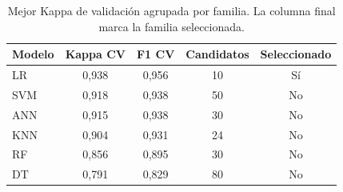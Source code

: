 \begin{table}[htbp]
 \centering
 \small
 \setlength{\tabcolsep}{4pt}
 \caption{Mejor Kappa de validación agrupada por familia. La columna final marca la familia seleccionada.}
 \label{tab:hpo}
 \begin{tabular}{lcccc}
  \toprule
  Modelo & Kappa CV & F1 CV & Candidatos & Seleccionado \\
  \midrule
  LR & 0{,}938 & 0{,}956 & 10 & Sí \\
  SVM & 0{,}918 & 0{,}938 & 50 & No \\
  ANN & 0{,}915 & 0{,}938 & 30 & No \\
  KNN & 0{,}904 & 0{,}931 & 24 & No \\
  RF & 0{,}856 & 0{,}895 & 30 & No \\
  DT & 0{,}791 & 0{,}829 & 80 & No \\
  \bottomrule
 \end{tabular}
\end{table}
